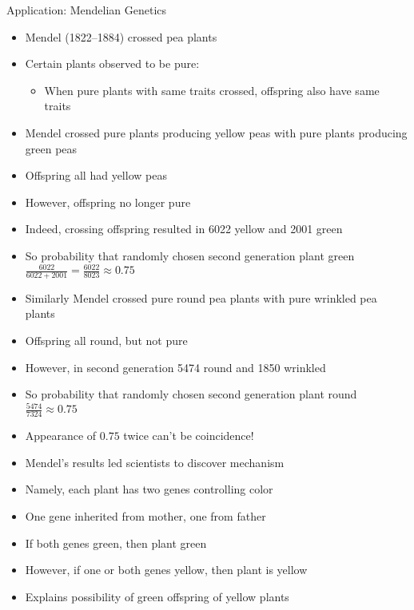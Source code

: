\documentclass[handout]{beamer}
\theoremstyle{definition}
\begin{document}
\begin{frame}{Application: Mendelian Genetics}
\begin{itemize}
\item Mendel (1822--1884) crossed pea plants 
\item Certain plants observed to be \alert{pure}:
\begin{itemize}
\item When pure plants with same traits crossed,
offspring also have same traits
\end{itemize}
\item Mendel crossed pure plants producing yellow peas
with pure plants producing green peas
\item Offspring all had yellow peas
\item However, offspring no longer pure
\item Indeed, crossing offspring resulted in 
6022 yellow and 2001 green
\item So probability that randomly chosen second generation plant green
$\frac{6022}{6022+2001}=\frac{6022}{8023}\approx 0.75$
\end{itemize}
\end{frame}

\begin{frame}
\begin{itemize}
\item Similarly Mendel crossed pure round pea plants with pure wrinkled pea plants
\item Offspring all round, but not pure
\item However, in second generation 5474 round and 1850 wrinkled
\item So probability that randomly chosen second generation plant round
$\frac{5474}{7324}\approx 0.75$
\end{itemize}
\end{frame}

\begin{frame}
\begin{itemize}
\item Appearance of $0.75$ twice can't be coincidence!
\item Mendel's results led scientists to discover mechanism
\item Namely, each plant has two \alert{genes} controlling color
\item One gene inherited from mother, one from father
\item If both genes green, then plant green
\item However, if one or both genes yellow, then plant is yellow
\item Explains possibility of green offspring of yellow plants
\end{itemize}
\end{frame}
\end{document}
